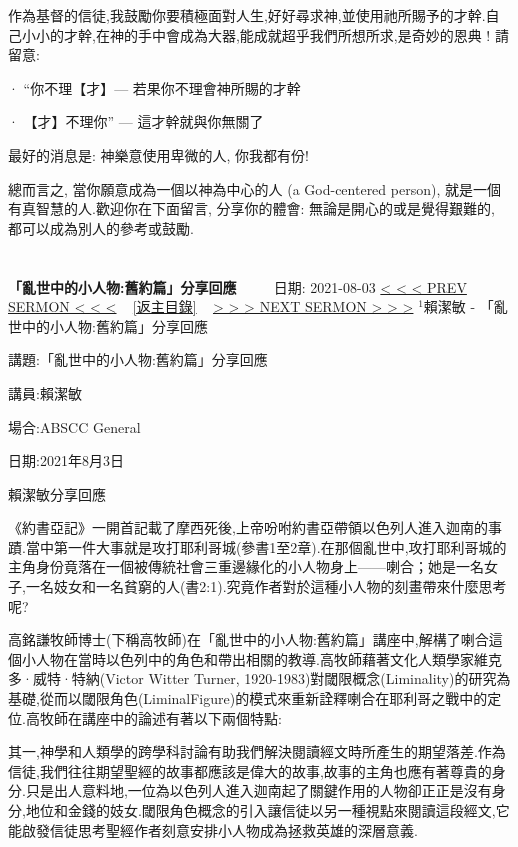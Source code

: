 \documentclass{book}
\begin{document}
作為基督的信徒,我鼓勵你要積極面對人生,好好尋求神,並使用祂所賜予的才幹.自己小小的才幹,在神的手中會成為大器,能成就超乎我們所想所求,是奇妙的恩典 !  請留意:

· “你不理【才】--- 若果你不理會神所賜的才幹

· 【才】不理你” --- 這才幹就與你無關了

最好的消息是: 神樂意使用卑微的人, 你我都有份!

總而言之, 當你願意成為一個以神為中心的人 (a God-centered person), 就是一個有真智慧的人.歡迎你在下面留言, 分享你的體會: 無論是開心的或是覺得艱難的, 都可以成為別人的參考或鼓勵.
\newpage



\section{}
\label{sec:3}
\textbf{「亂世中的小人物:舊約篇」分享回應}
\newline
\newline
~~~~ 日期: 2021-08-03
\newline
\newline
\hyperref[sec:2]{\small{< < < PREV SERMON < < <}}
~
\hyperref[sec:index]{\small{[返主目錄]}}
~
\hyperref[sec:4]{\small{> > > NEXT SERMON > > >}}
\newline
\newline
$^{1}$賴潔敏 - 「亂世中的小人物:舊約篇」分享回應

講題:「亂世中的小人物:舊約篇」分享回應

講員:賴潔敏

場合:ABSCC General

日期:2021年8月3日

賴潔敏分享回應

《約書亞記》一開首記載了摩西死後,上帝吩咐約書亞帶領以色列人進入迦南的事蹟.當中第一件大事就是攻打耶利哥城(參書1至2章).在那個亂世中,攻打耶利哥城的主角身份竟落在一個被傳統社會三重邊緣化的小人物身上——喇合；她是一名女子,一名妓女和一名貧窮的人(書2:1).究竟作者對於這種小人物的刻畫帶來什麼思考呢?

高銘謙牧師博士(下稱高牧師)在「亂世中的小人物:舊約篇」講座中,解構了喇合這個小人物在當時以色列中的角色和帶出相關的教導.高牧師藉著文化人類學家維克多·威特·特納(Victor Witter Turner, 1920-1983)對閾限概念(Liminality)的研究為基礎,從而以閾限角色(LiminalFigure)的模式來重新詮釋喇合在耶利哥之戰中的定位.高牧師在講座中的論述有著以下兩個特點:

其一,神學和人類學的跨學科討論有助我們解決閱讀經文時所產生的期望落差.作為信徒,我們往往期望聖經的故事都應該是偉大的故事,故事的主角也應有著尊貴的身分.只是出人意料地,一位為以色列人進入迦南起了關鍵作用的人物卻正正是沒有身分,地位和金錢的妓女.閾限角色概念的引入讓信徒以另一種視點來閱讀這段經文,它能啟發信徒思考聖經作者刻意安排小人物成為拯救英雄的深層意義.
\end{document}
